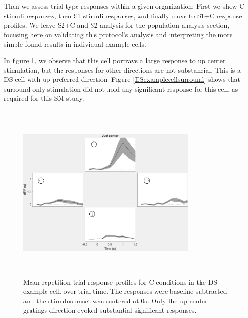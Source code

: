 Then we assess trial type responses within a given organization: First we show C stimuli responses, then S1 stimuli responses, and finally move to S1+C response profiles. We leave S2+C and S2 analysis for the population analysis section, focusing here on validating this protocol's analysis and interpreting the more simple found results in individual example cells.

In figure \ref{DSexamplecellcenter}, we observe that this cell portrays a large response to up center stimulation, but the responses for other directions are not substancial. This is a DS cell with up preferred direction. Figure \ref{DSexamplecellsurround} shows that surround-only stimulation did not hold any significant response for this cell, as required for this SM study.

\begin{figure}[H] \centering \includegraphics[width=9cm,height=9cm,keepaspectratio]{Figures/7.Results/individualSM/roi_29_mf379_pos5/justcenter.png} 
\caption{Mean repetition trial response profiles for C conditions in the DS example cell, over trial time. The responses were baseline subtracted and the stimulus onset was centered at 0s. Only the up center gratings direction evoked substantial significant responses.}
\label{DSexamplecellcenter}
\end{figure}


